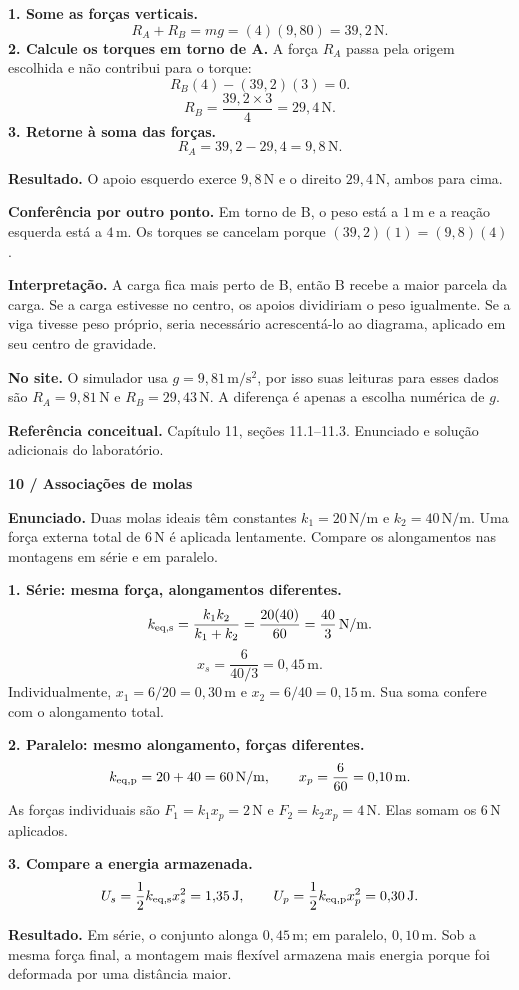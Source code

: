 \documentclass[11pt,a4paper]{article}
\newcommand{\result}[1]{\par\colorbox{pale}{\parbox{\dimexpr\linewidth-2\fboxsep}{\vspace{4pt}\textbf{Resultado.} #1\vspace{4pt}}}\par}
\newcommand{\exercise}[2]{{\LARGE\bfseries\color{ink}#1}\par\vspace{3pt}{\large #2}\par\vspace{5pt}}
\begin{document}
\textbf{1. Some as forças verticais.}
\[
R_A+R_B=mg=(4)(9{,}80)=39{,}2\,\mathrm N.
\]
\textbf{2. Calcule os torques em torno de A.} A força $R_A$ passa pela origem escolhida e não contribui para o torque:
\[
R_B(4)-(39{,}2)(3)=0.
\]
\[
R_B=\frac{39{,}2\times3}{4}=29{,}4\,\mathrm N.
\]
\textbf{3. Retorne à soma das forças.}
\[
R_A=39{,}2-29{,}4=9{,}8\,\mathrm N.
\]
\result{O apoio esquerdo exerce $9{,}8\,\mathrm N$ e o direito $29{,}4\,\mathrm N$, ambos para cima.}

\textbf{Conferência por outro ponto.} Em torno de B, o peso está a $1\,\mathrm m$ e a reação esquerda está a $4\,\mathrm m$. Os torques se cancelam porque $(39{,}2)(1)=(9{,}8)(4)$.

\textbf{Interpretação.} A carga fica mais perto de B, então B recebe a maior parcela da carga. Se a carga estivesse no centro, os apoios dividiriam o peso igualmente. Se a viga tivesse peso próprio, seria necessário acrescentá-lo ao diagrama, aplicado em seu centro de gravidade.

\textbf{No site.} O simulador usa $g=9{,}81\,\mathrm{m/s^2}$, por isso suas leituras para esses dados são $R_A=9{,}81\,\mathrm N$ e $R_B=29{,}43\,\mathrm N$. A diferença é apenas a escolha numérica de $g$.

\textbf{Referência conceitual.} Capítulo 11, seções 11.1--11.3. Enunciado e solução adicionais do laboratório.

\newpage
\exercise{10 / Associações de molas}{Exercício adicional do laboratório}
\textbf{Enunciado.} Duas molas ideais têm constantes $k_1=20\,\mathrm{N/m}$ e $k_2=40\,\mathrm{N/m}$. Uma força externa total de $6\,\mathrm N$ é aplicada lentamente. Compare os alongamentos nas montagens em série e em paralelo.

\textbf{1. Série: mesma força, alongamentos diferentes.}
\[
k_{\rm eq,s}=\frac{k_1k_2}{k_1+k_2}=\frac{20(40)}{60}=\frac{40}{3}\,\mathrm{N/m}.
\]
\[
x_s=\frac{6}{40/3}=0{,}45\,\mathrm m.
\]
Individualmente, $x_1=6/20=0{,}30\,\mathrm m$ e $x_2=6/40=0{,}15\,\mathrm m$. Sua soma confere com o alongamento total.

\textbf{2. Paralelo: mesmo alongamento, forças diferentes.}
\[
k_{\rm eq,p}=20+40=60\,\mathrm{N/m},\qquad x_p=\frac6{60}=0{,}10\,\mathrm m.
\]
As forças individuais são $F_1=k_1x_p=2\,\mathrm N$ e $F_2=k_2x_p=4\,\mathrm N$. Elas somam os $6\,\mathrm N$ aplicados.

\textbf{3. Compare a energia armazenada.}
\[
U_s=\frac12k_{\rm eq,s}x_s^2=1{,}35\,\mathrm J,\qquad
U_p=\frac12k_{\rm eq,p}x_p^2=0{,}30\,\mathrm J.
\]
\result{Em série, o conjunto alonga $0{,}45\,\mathrm m$; em paralelo, $0{,}10\,\mathrm m$. Sob a mesma força final, a montagem mais flexível armazena mais energia porque foi deformada por uma distância maior.}
\end{document}
